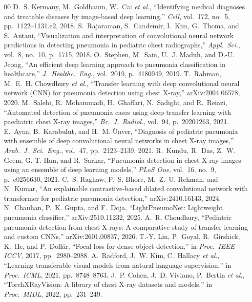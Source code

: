 \documentclass[conference]{IEEEtran}
\begin{document}
\begin{thebibliography}{00}
 D.~S. Kermany, M.~Goldbaum, W.~Cai \textit{et al.}, ``Identifying medical diagnoses and treatable diseases by image-based deep learning,'' \textit{Cell}, vol.~172, no.~5, pp.~1122--1131.e2, 2018.
 S.~Rajaraman, S.~Candemir, I.~Kim, G.~Thoma, and S.~Antani, ``Visualization and interpretation of convolutional neural network predictions in detecting pneumonia in pediatric chest radiographs,'' \textit{Appl.\ Sci.}, vol.~8, no.~10, p.~1715, 2018.
 O.~Stephen, M.~Sain, U.~J. Maduh, and D.-U. Jeong, ``An efficient deep learning approach to pneumonia classification in healthcare,'' \textit{J.\ Healthc.\ Eng.}, vol.~2019, p.~4180949, 2019.
 T.~Rahman, M.~E.~H. Chowdhury \textit{et al.}, ``Transfer learning with deep convolutional neural network (CNN) for pneumonia detection using chest X-ray,'' arXiv:2004.06578, 2020.
 M.~Salehi, R.~Mohammadi, H.~Ghaffari, N.~Sadighi, and R.~Reiazi, ``Automated detection of pneumonia cases using deep transfer learning with paediatric chest X-ray images,'' \textit{Br.\ J.\ Radiol.}, vol.~94, p.~20201263, 2021.
 E.~Ayan, B.~Karabulut, and H.~M. \"Unver, ``Diagnosis of pediatric pneumonia with ensemble of deep convolutional neural networks in chest X-ray images,'' \textit{Arab.\ J.\ Sci.\ Eng.}, vol.~47, pp.~2123--2139, 2021.
 R.~Kundu, R.~Das, Z.~W. Geem, G.-T. Han, and R.~Sarkar, ``Pneumonia detection in chest X-ray images using an ensemble of deep learning models,'' \textit{PLoS One}, vol.~16, no.~9, p.~e0256630, 2021.
 C.~S. Raghaw, P.~S. Bhore, M.~Z.~U. Rehman, and N.~Kumar, ``An explainable contrastive-based dilated convolutional network with transformer for pediatric pneumonia detection,'' arXiv:2410.16143, 2024.
 N.~Chauhan, P.~K. Gupta, and F.~Doja, ``LightPneumoNet: Lightweight pneumonia classifier,'' arXiv:2510.11232, 2025.
 A.~R. Choudhury, ``Pediatric pneumonia detection from chest X-rays: A comparative study of transfer learning and custom CNNs,'' arXiv:2601.00837, 2026.
 T.-Y. Lin, P.~Goyal, R.~Girshick, K.~He, and P.~Doll\'ar, ``Focal loss for dense object detection,'' in \textit{Proc.\ IEEE ICCV}, 2017, pp.~2980--2988.
 A.~Radford, J.~W. Kim, C.~Hallacy \textit{et al.}, ``Learning transferable visual models from natural language supervision,'' in \textit{Proc.\ ICML}, 2021, pp.~8748--8763.
 J.~P. Cohen, J.~D. Viviano, P.~Bertin \textit{et al.}, ``TorchXRayVision: A library of chest X-ray datasets and models,'' in \textit{Proc.\ MIDL}, 2022, pp.~231--249.
\end{thebibliography}
\end{document}
